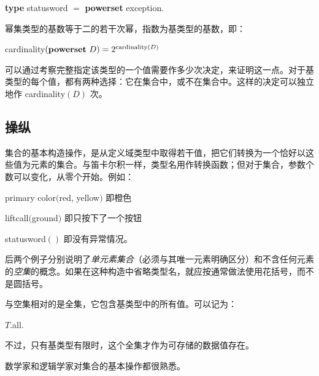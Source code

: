 \quad \textbf{type} statusword $=$ \textbf{powerset} exception.

幂集类型的基数等于二的若干次幂，指数为基类型的基数，即：

\quad cardinality$(\text{\textbf{powerset} } D) = 2^{\text{cardinality} (D)}$

可以通过考察完整指定该类型的一个值需要作多少次决定，来证明这一点。对于基类型的每个值，都有两种选择：它在集合中，或不在集合中。这样的决定可以独立地作 cardinality$(D)$ 次。

\subsection{操纵}

集合的基本构造操作，是从定义域类型中取得若干值，把它们转换为一个恰好以这些值为元素的集合。与笛卡尔积一样，类型名用作转换函数；但对于集合，参数个数可以变化，从零个开始。例如：

\quad primary color$($red, yellow$)$ \tabto*{14em} 即橙色

\quad liftcall$($ground$)$ \tabto*{14em} 即只按下了一个按钮

\quad statusword$()$ \tabto*{14em} 即没有异常情况。

\noindent
后两个例子分别说明了\textit{单元素集合}（必须与其唯一元素明确区分）和不含任何元素的\textit{空集}的概念。如果在这种构造中省略类型名，就应按通常做法使用花括号，而不是圆括号。

与空集相对的是全集，它包含基类型中的所有值。可以记为：

\quad $T$.all.

\noindent
不过，只有基类型有限时，这个全集才作为可存储的数据值存在。

数学家和逻辑学家对集合的基本操作都很熟悉。

